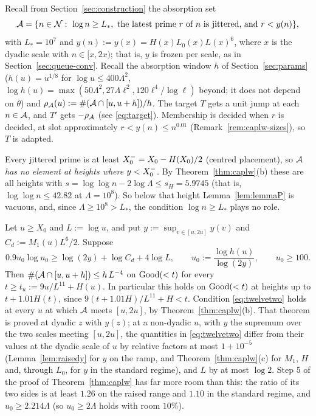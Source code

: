 Recall from Section~\ref{sec:construction} the absorption set
\[
\Abs=\{n\in\NN:\ \log n\ge L_*,\ \text{the latest prime $r$ of $n$ is jittered, and }r<y(n)\},
\]
with $L_*=10^7$ and $y(n):=y(x)=H(x)L_0(x)L(x)^6$, where $x$ is the dyadic scale with $n\in[x,2x)$; that is, $y$ is frozen
per scale, as in Section~\ref{sec:queue-conv}.
Recall the absorption window $h$ of Section~\ref{sec:params} ($h(u)=u^{1/8}$ for $\log u\le400\Lambda^2$,
$\log h(u)=\max(50\Lambda^2,27\Lambda\ell^2,120\ell^4/\log\ell)$ beyond; it does not depend on $\theta$) and
$\rho_{\mathcal{A}}(u):=\#(\mathcal{A}\cap[u,u+h])/h$. The target $T$
gets a unit jump at each $n\in\mathcal{A}$, and $T'$ gets $-\rho_{\mathcal{A}}$ (see \eqref{eq:target}). Membership is decided when $r$ is
decided, at slot approximately $r<y(n)\le n^{0.01}$ (Remark~\ref{rem:caplw-sizes}), so $T$ is adapted.

Every jittered prime is at least $X_0^{-}=X_0-H(X_0)/2$ (centred placement), so \emph{$\mathcal{A}$ has no element at heights where
$y<X_0^{-}$.} By Theorem~\ref{thm:caplw}(b) these are all heights with $s=\log\log n-2\log\Lambda\le s_H=5.9745$ (that is,
$\log\log n\le42.82$ at $\Lambda=10^8$). So below that height Lemma~\ref{lem:lemmaP} is vacuous, and, since $\Lambda\ge10^8>L_*$, the condition $\log n\ge L_*$
plays no role.

\begin{lemma}\label{lem:lemmaP}
Let $u\ge X_0$ and $L:=\log u$, and put $y:=\sup_{v\in[u,2u]}y(v)$ and $C_d:=M_1(u)L^6/2$. Suppose
\begin{equation}\label{eq:twelvetwo}
0.9u_0\log u_0\ge\log(2y)+\log C_d+4\log L,\qquad u_0:=\frac{\log h(u)}{\log(2y)},\qquad u_0\ge100.
\end{equation}
Then $\#(\mathcal{A}\cap[u,u+h])\le h\,L^{-4}$ on $\mathrm{Good}(<t)$ for every $t\ge t_u:=9u/L^{11}+H(u)$. In particular this holds on
$\mathrm{Good}(<t)$ at heights up to $t+1.01H(t)$, since $9(t+1.01H)/L^{11}+H<t$. Condition \eqref{eq:twelvetwo} holds at every $u$ at
which $\mathcal{A}$ meets $[u,2u]$, by Theorem~\ref{thm:caplw}(b). That theorem is proved at dyadic $z$ with $y(z)$; at a
non-dyadic $u$, with $y$ the supremum over the two scales meeting $[u,2u]$, the quantities in \eqref{eq:twelvetwo} differ from
their values at the dyadic scale of $u$ by relative factors at most $1+10^{-5}$ (Lemma~\ref{lem:raisedy} for $y$ on the ramp, and
Theorem~\ref{thm:caplw}(c) for $M_1$, $H$ and, through $L_0$, for $y$ in the standard regime), and $L$ by at most $\log2$. Step 5 of the proof of Theorem~\ref{thm:caplw} has
far more room than this: the ratio of its two sides is at least $1.26$ on the raised range and $1.10$ in the standard regime, and
$u_0\ge2.214\Lambda$ (so $u_0\ge2\Lambda$ holds with room $10\%$).
\end{lemma}


